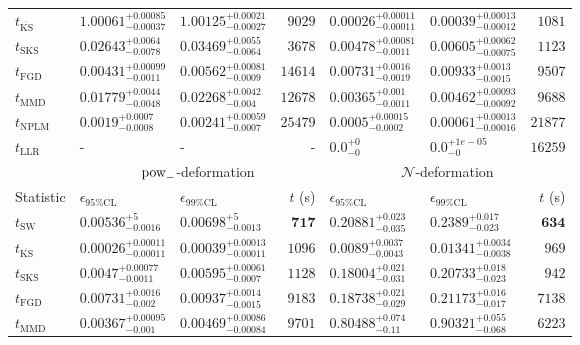 \begin{tabular}{l|llr|llr}
	$t_{\overline{\mathrm{KS}}}$ & $1.00061_{-0.00037}^{+0.00085}$ & $1.00125_{-0.00027}^{+0.00021}$ & $9029$ & ${\mathbf{0.00026_{-0.00011}^{+0.00011}}}$ & ${\mathbf{0.00039_{-0.00012}^{+0.00013}}}$ & $1081$ \\
	$t_{\mathrm{SKS}}$ & $0.02643_{-0.0078}^{+0.0064}$ & $0.03469_{-0.0064}^{+0.0055}$ & $3678$ & $0.00478_{-0.0011}^{+0.00081}$ & $0.00605_{-0.00075}^{+0.00062}$ & $1123$ \\
	$t_{\mathrm{FGD}}$ & ${\mathbf{0.00431_{-0.0011}^{+0.00099}}}$ & ${\mathbf{0.00562_{-0.0009}^{+0.00081}}}$ & $14614$ & $0.00731_{-0.0019}^{+0.0016}$ & $0.00933_{-0.0015}^{+0.0013}$ & $9507$ \\
	$t_{\mathrm{MMD}}$ & $0.01779_{-0.0048}^{+0.0044}$ & $0.02268_{-0.004}^{+0.0042}$ & $12678$ & $0.00365_{-0.0011}^{+0.001}$ & $0.00462_{-0.00092}^{+0.00093}$ & $9688$ \\
\rowcolor{red!35}	$t_{\mathrm{NPLM}}$ & $0.0019_{-0.0008}^{+0.0007}$ & $0.00241_{-0.0007}^{+0.00059}$ & $25479$ & $0.0005_{-0.0002}^{+0.00015}$ & $0.00061_{-0.00016}^{+0.00013}$ & $21877$ \\
	$t_{\mathrm{LLR}}$ & - & - & - & $0.0_{-0}^{+0}$ & $0.0_{-0}^{+1e-05}$ & $16259$ \\
	\toprule
	\multicolumn{1}{c}{} & \multicolumn{3}{c}{$\rm{pow}_{-}$-deformation} & \multicolumn{3}{c}{$\mathcal{N}$-deformation} \\
	Statistic & $\epsilon_{95\%\mathrm{CL}}$ & $\epsilon_{99\%\mathrm{CL}}$ & $t$ (s) & $\epsilon_{95\%\mathrm{CL}}$ & $\epsilon_{99\%\mathrm{CL}}$ & $t$ (s) \\
	\midrule
	$t_{\mathrm{SW}}$ & $0.00536_{-0.0016}^{+5}$ & $0.00698_{-0.0013}^{+5}$ & ${\mathbf{717}}$ & $0.20881_{-0.035}^{+0.023}$ & $0.2389_{-0.023}^{+0.017}$ & ${\mathbf{634}}$ \\
	$t_{\overline{\mathrm{KS}}}$ & ${\mathbf{0.00026_{-0.00011}^{+0.00011}}}$ & ${\mathbf{0.00039_{-0.00011}^{+0.00013}}}$ & $1096$ & ${\mathbf{0.0089_{-0.0043}^{+0.0037}}}$ & ${\mathbf{0.01341_{-0.0038}^{+0.0034}}}$ & $969$ \\
	$t_{\mathrm{SKS}}$ & $0.0047_{-0.0011}^{+0.00077}$ & $0.00595_{-0.0007}^{+0.00061}$ & $1128$ & $0.18004_{-0.031}^{+0.021}$ & $0.20733_{-0.023}^{+0.018}$ & $942$ \\
	$t_{\mathrm{FGD}}$ & $0.00731_{-0.002}^{+0.0016}$ & $0.00937_{-0.0015}^{+0.0014}$ & $9183$ & $0.18738_{-0.029}^{+0.021}$ & $0.21173_{-0.017}^{+0.016}$ & $7138$ \\
	$t_{\mathrm{MMD}}$ & $0.00367_{-0.001}^{+0.00095}$ & $0.00469_{-0.00084}^{+0.00086}$ & $9701$ & $0.80488_{-0.11}^{+0.074}$ & $0.90321_{-0.068}^{+0.055}$ & $6223$ \\

\end{tabular}
